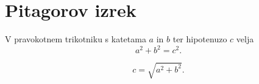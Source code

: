 \documentclass{article}
\begin{document}
\section*{Pitagorov izrek}
V pravokotnem trikotniku s katetama \(a\) in \(b\) ter hipotenuzo \(c\) velja
\[ a^2 + b^2 = c^2 .\]

\[ c = \sqrt{a^2 + b^2} .\]
\end{document}
